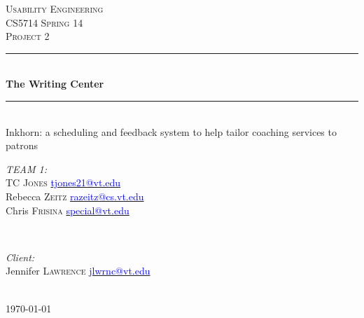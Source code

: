 \documentclass[12pt]{article} %
\begin{document}

\begin{titlepage}

\newcommand{\HRule}{\rule{\linewidth}{0.5mm}} %

\center %

\textsc{\LARGE Usability Engineering}\\[1.5cm] %
\textsc{\Large CS5714 Spring 14}\\[0.5cm] %
\textsc{\large Project 2}\\[0.5cm] %

\HRule \\[0.4cm]
{ \huge \bfseries The Writing Center }\\[0.4cm] %
\HRule \\[0.4cm]
{ \small Inkhorn: a scheduling and feedback system to help tailor coaching services to patrons }\\[0.4cm] %
\vspace{1.5cm}


\begin{minipage}{0.4\textwidth}
\begin{flushleft} \large
\emph{TEAM 1:}\\
TC \textsc{Jones} \href{mailto:tjones21@vt.edu}{\textcolor{blue}{tjones21@vt.edu}}\\
Rebecca \textsc{Zeitz} \href{mailto:razeitz@cs.vt.edu}{\textcolor{blue}{razeitz@cs.vt.edu}}\\
Chris \textsc{Frisina}  \href{mailto:special@vt.edu}{\textcolor{blue}{special@vt.edu}}\\
\end{flushleft}
\end{minipage}
~
\begin{minipage}{0.4\textwidth}
\begin{flushright} \large
\emph{Client:} \\
Jennifer \textsc{Lawrence}  \href{mailto:jlwrnc@vt.edu}{\textcolor{blue}{jlwrnc@vt.edu}}\\
\end{flushright}
\end{minipage}\\[4cm]

{\large \today}\\[3cm] %


\vfill %

\end{titlepage}
\end{document}
